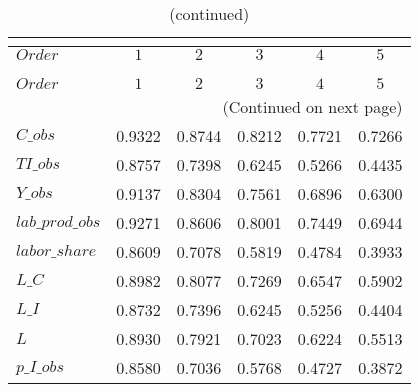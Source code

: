  
\begin{center}
\begin{longtable}{lccccc} 
\caption{COEFFICIENTS OF AUTOCORRELATION}\\
 \label{Table:th_autocorr_matrix}\\
\toprule 
$Order           $	 & 	 $         1$	 & 	 $         2$	 & 	 $         3$	 & 	 $         4$	 & 	 $         5$\\
\midrule \endfirsthead 
\caption{(continued)}\\
 \toprule \\ 
$Order           $	 & 	 $         1$	 & 	 $         2$	 & 	 $         3$	 & 	 $         4$	 & 	 $         5$\\
\midrule \endhead 
\midrule \multicolumn{6}{r}{(Continued on next page)} \\ \bottomrule \endfoot 
\bottomrule \endlastfoot 
$C\_obs          $	 & 	    0.9322	 & 	    0.8744	 & 	    0.8212	 & 	    0.7721	 & 	    0.7266 \\ 
$TI\_obs         $	 & 	    0.8757	 & 	    0.7398	 & 	    0.6245	 & 	    0.5266	 & 	    0.4435 \\ 
$Y\_obs          $	 & 	    0.9137	 & 	    0.8304	 & 	    0.7561	 & 	    0.6896	 & 	    0.6300 \\ 
$lab\_prod\_obs  $	 & 	    0.9271	 & 	    0.8606	 & 	    0.8001	 & 	    0.7449	 & 	    0.6944 \\ 
$labor\_share    $	 & 	    0.8609	 & 	    0.7078	 & 	    0.5819	 & 	    0.4784	 & 	    0.3933 \\ 
$L\_C            $	 & 	    0.8982	 & 	    0.8077	 & 	    0.7269	 & 	    0.6547	 & 	    0.5902 \\ 
$L\_I            $	 & 	    0.8732	 & 	    0.7396	 & 	    0.6245	 & 	    0.5256	 & 	    0.4404 \\ 
$L               $	 & 	    0.8930	 & 	    0.7921	 & 	    0.7023	 & 	    0.6224	 & 	    0.5513 \\ 
$p\_I\_obs       $	 & 	    0.8580	 & 	    0.7036	 & 	    0.5768	 & 	    0.4727	 & 	    0.3872 \\ 
\end{longtable}
 \end{center}
